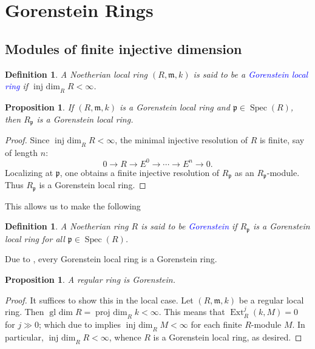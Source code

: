 \documentclass[10pt]{article}
\theoremstyle{thmstyle}
\newtheorem{proposition}[theorem]{Proposition}
\theoremstyle{defstyle}
\newtheorem{definition}[theorem]{Definition}
\newcommand{\Spec}{\operatorname{Spec}}
\newcommand{\frakm}{\mathfrak{m}} %
\newcommand{\frakp}{\mathfrak{p}} %
\newcommand{\define}[1]{\textcolor{blue}{\textit{#1}}}
\newcommand{\Ext}{\operatorname{Ext}}
\newcommand{\projdim}{\operatorname{proj~dim}}
\newcommand{\injdim}{\operatorname{inj~dim}}
\newcommand{\gldim}{\operatorname{gl~dim}}
\begin{document}
\section{Gorenstein Rings}
\subsection{Modules of finite injective dimension}

\begin{definition}
    A Noetherian local ring $(R,\frakm, k)$ is said to be a \define{Gorenstein local ring} if $\injdim_R R < \infty$.
\end{definition}

\begin{proposition}
    If $(R,\frakm, k)$ is a Gorenstein local ring and $\frakp\in\Spec(R)$, then $R_\frakp$ is a Gorenstein local ring.
\end{proposition}
\begin{proof}
    Since $\injdim_R R < \infty$, the minimal injective resolution of $R$ is finite, say of length $n$: 
    \begin{equation*}
        0\to R\to E^0\to\cdots\to E^n\to 0.
    \end{equation*}
    Localizing at $\frakp$, one obtains a finite injective resolution of $R_\frakp$ as an $R_\frakp$-module. Thus $R_\frakp$ is a Gorenstein local ring.
\end{proof}

This allows us to make the following 
\begin{definition}
    A Noetherian ring $R$ is said to be \define{Gorenstein} if $R_\frakp$ is a Gorenstein local ring for all $\frakp\in\Spec(R)$.
\end{definition}
Due to , every Gorenstein local ring is a Gorenstein ring.

\begin{proposition}
    A regular ring is Gorenstein.
\end{proposition}
\begin{proof}
    It suffices to show this in the local case. Let $(R,\frakm, k)$ be a regular local ring. Then $\gldim R = \projdim_R k < \infty$. This means that $\Ext^j_R(k, M) = 0$ for $j\gg 0$; which due to  implies $\injdim_R M < \infty$ for each finite $R$-module $M$. In particular, $\injdim_R R < \infty$, whence $R$ is a Gorenstein local ring, as desired.
\end{proof}
\end{document}
